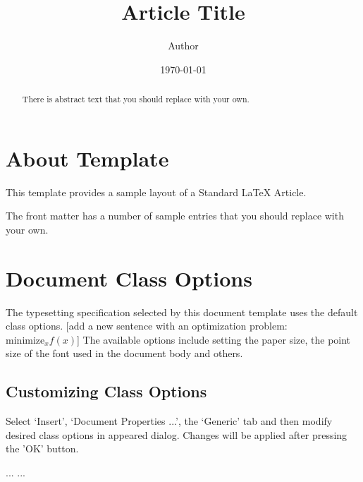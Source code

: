 \documentclass{article}
\begin{document}
\title{Article Title}
\author{Author}
\date{\today}
\maketitle

\begin{abstract}
    There is abstract text that you should replace with your own.
\end{abstract}


\section{About Template}
This template provides a sample layout of a Standard \LaTeX{} Article.

The front matter has a number of sample entries that you should replace
with your own.

\section{Document Class Options}
The typesetting specification selected by this document template
uses the default class options. [add a new sentence with an optimization problem: $\mathrm{minimize}_x f(x)$] The available options include
setting the paper size, the point size of the font used in the
document body and others.

\subsection{Customizing Class Options}
Select `Insert', `Document Properties ...', the `Generic' tab
and then modify desired class options in appeared dialog.
Changes will be applied after pressing the 'OK' button.

\begin{thebibliography}{99}
 ...
 ...
\end{thebibliography}
\end{document}
